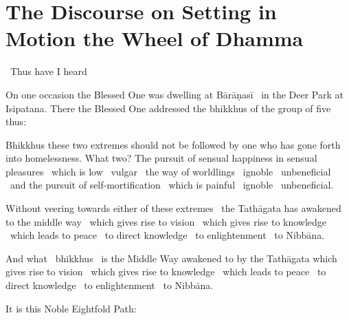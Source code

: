 \section{The Discourse on Setting in Motion the Wheel of Dhamma}
\label{wheel-of-dhamma-full}

\begin{leader-english}
  \anglebracketleft\ \hspace{-0.5mm}Thus have I heard \hspace{-0.5mm}\anglebracketright\
\end{leader-english}

\smallskip

\begin{english-hang}
  On one occasion the Blessed One was dwelling at Bārāṇasī \breathmark\ in the Deer Park at Isipatana. There the Blessed One addressed the bhikkhus of the group of five thus:
\end{english-hang}

\begin{english-hang}
  Bhikkhus these two extremes should not be followed by one who has gone forth into homelessness. What two? The pursuit of sensual happiness in sensual pleasures \breathmark\ which is low \breathmark\ vulgar \breathmark\ the way of worldlings \breathmark\ ignoble \breathmark\ unbeneficial \breathmark\ and the pursuit of self-mortification \breathmark\ which is painful \breathmark\ ignoble \breathmark\ unbeneficial.
\end{english-hang}

\begin{english-hang}
  Without veering towards either of these extremes \breathmark\ the Tathāgata has awakened to the middle way \breathmark\ which gives rise to vision \breathmark\ which gives rise to knowledge \breathmark\ which leads to peace \breathmark\ to direct knowledge \breathmark\ to enlightenment \breathmark\ to Nibbāna.
\end{english-hang}

\begin{english-hang}
  And what \breathmark\ bhikkhus \breathmark\ is the Middle Way awakened to by the Tathāgata which gives rise to vision \breathmark\ which gives rise to knowledge \breathmark\ which leads to peace \breathmark\ to direct knowledge \breathmark\ to enlightenment \breathmark\ to Nibbāna.
\end{english-hang}

\begin{english-hang}
  It is this Noble Eightfold Path:
\end{english-hang}

